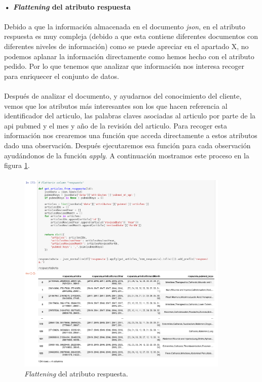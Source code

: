 \documentclass[10pt,a4paper,oneside]{book}
\begin{document}
\paragraph{• \textit{Flattening} del atributo respuesta}

\paragraph{}
Debido a que la información almacenada en el documento \textit{json}, en el atributo respuesta es muy compleja (debido a que esta contiene diferentes documentos con diferentes niveles de información) como se puede apreciar en el apartado X, no podemos aplanar la información directamente como hemos hecho con el atributo pedido. Por lo que tenemos que analizar que información nos interesa recoger para enriquecer el conjunto de datos.

\paragraph{}
Después de analizar el documento, y ayudarnos del conocimiento del cliente, vemos que los atributos más interesantes son los que hacen referencia al identificador del articulo, las palabras claves asociadas al articulo por parte de la api pubmed y el mes y año de la revisión del articulo. Para recoger esta información nos crearemos una función que acceda directamente a estos atributos dado una observación. Después ejecutaremos esa función para cada observación ayudándonos de la función \textit{apply}. A continuación mostramos este proceso en la figura \ref{flatteningRespuesta}.

\paragraph{}
\begin{figure}[!htb]
  \centering
    \includegraphics[width=0.9\textwidth]{images/metodologia-aplanar-respuesta.png}
    \caption{\textit{Flattening} del atributo respuesta.}
  \label{flatteningRespuesta}
\end{figure}
\end{document}
